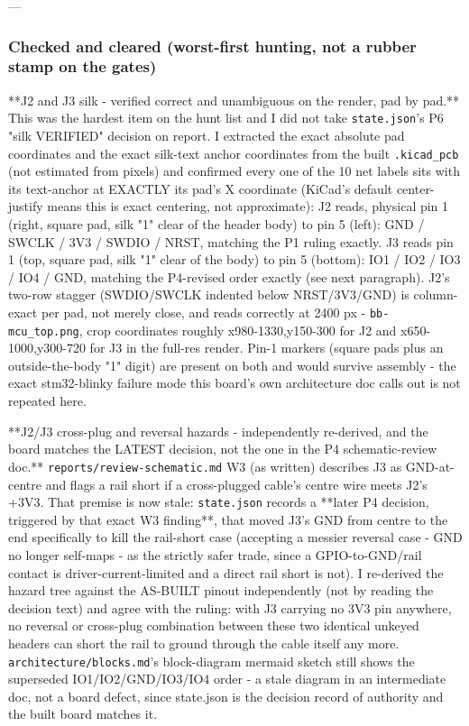 \documentclass[11pt,a4paper]{article}
\begin{document}
---

\subsubsection*{Checked and cleared (worst-first hunting, not a rubber stamp on the gates)}
{*}{*}J2 and J3 silk - verified correct and unambiguous on the render, pad by pad.{*}{*} This was the hardest item on the hunt list and I did not take \texttt{state.json}'s P6 "silk VERIFIED" decision on report. I extracted the exact absolute pad coordinates and the exact silk-text anchor coordinates from the built \texttt{.kicad\_pcb} (not estimated from pixels) and confirmed every one of the 10 net labels sits with its text-anchor at EXACTLY its pad's X coordinate (KiCad's default center-justify means this is exact centering, not approximate): J2 reads, physical pin 1 (right, square pad, silk "1" clear of the header body) to pin 5 (left): GND / SWCLK / 3V3 / SWDIO / NRST, matching the P1 ruling exactly. J3 reads pin 1 (top, square pad, silk "1" clear of the body) to pin 5 (bottom): IO1 / IO2 / IO3 / IO4 / GND, matching the P4-revised order exactly (see next paragraph). J2's two-row stagger (SWDIO/SWCLK indented below NRST/3V3/GND) is column-exact per pad, not merely close, and reads correctly at 2400 px - \texttt{bb-mcu\_top.png}, crop coordinates roughly x980-1330,y150-300 for J2 and x650-1000,y300-720 for J3 in the full-res render. Pin-1 markers (square pads plus an outside-the-body "1" digit) are present on both and would survive assembly - the exact stm32-blinky failure mode this board's own architecture doc calls out is not repeated here.

{*}{*}J2/J3 cross-plug and reversal hazards - independently re-derived, and the board matches the LATEST decision, not the one in the P4 schematic-review doc.{*}{*} \texttt{reports/review-schematic.md} W3 (as written) describes J3 as GND-at-centre and flags a rail short if a cross-plugged cable's centre wire meets J2's +3V3. That premise is now stale: \texttt{state.json} records a {*}{*}later P4 decision, triggered by that exact W3 finding{*}{*}, that moved J3's GND from centre to the end specifically to kill the rail-short case (accepting a messier reversal case - GND no longer self-maps - as the strictly safer trade, since a GPIO-to-GND/rail contact is driver-current-limited and a direct rail short is not). I re-derived the hazard tree against the AS-BUILT pinout independently (not by reading the decision text) and agree with the ruling: with J3 carrying no 3V3 pin anywhere, no reversal or cross-plug combination between these two identical unkeyed headers can short the rail to ground through the cable itself any more. \texttt{architecture/blocks.md}'s block-diagram mermaid sketch still shows the superseded IO1/IO2/GND/IO3/IO4 order - a stale diagram in an intermediate doc, not a board defect, since state.json is the decision record of authority and the built board matches it.
\end{document}
